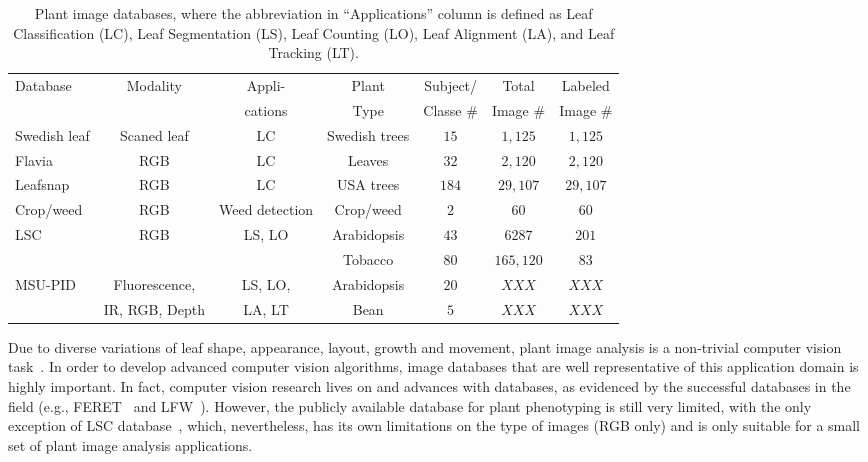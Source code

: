 \begin{table*}[t!]
	\centering
	\caption{Plant image databases, where the abbreviation in ``Applications'' column is defined as Leaf Classification (LC), Leaf Segmentation (LS), Leaf Counting (LO), Leaf Alignment (LA), and Leaf Tracking (LT).}
	\begin{tabular}{l|c|c|c|c|c|c}
		\hline
		\multirow{2}{*}{Database}&  \multirow{2}{*}{Modality}  & Appli-& Plant & Subject/ &Total  &  Labeled   \\ 						
			&         & cations &            Type         &       Classe \#         &  Image \#    & Image \# \\ \hline
		
Swedish leaf &  Scaned leaf & LC& Swedish trees & $15$ & $1,125$ & $1,125$ \\ \hline
Flavia& RGB  & LC& Leaves & $32$  & $2,120$ & $2,120$ \\ \hline
Leafsnap  & RGB & LC& USA trees & $184$ & $29,107$  &  $29,107$ \\ \hline
Crop/weed &  RGB &Weed detection & Crop/weed & $2$  & $60$ & $60$ \\ \hline
\multirow{2}{*}{LSC} & \multirow{2}{*}{RGB}  & \multirow{2}{*}{LS, LO} & Arabidopsis &  $43$ & $6287$ & $201$ \\ \cline{4-7}
							    &  & & Tobacco & $80$ & $165,120$ & $83$ \\ \hline
\multirow{2}{*}{MSU-PID}  & Fluorescence,  & LS, LO, & Arabidopsis &  $20$ & $XXX$ & $XXX$ \\ \cline{4-7}
							    & IR, RGB, Depth & LA, LT & Bean & $5$ & $XXX$ & $XXX$ \\ \hline
	       \hline
	\end{tabular}
	\label{tab:database}
\end{table*}

Due to diverse variations of leaf shape, appearance, layout, growth and movement, plant image analysis is a non-trivial computer vision task~\cite{Minervini2015}. 
In order to develop advanced computer vision algorithms, image databases that are well representative of this application domain is highly important. 
In fact, computer vision research lives on and advances with databases, as evidenced by the successful databases in the field (e.g., FERET~\cite{Phillips2000} and LFW~\cite{LFW}). 
However, the publicly available database for plant phenotyping is still very limited, with the only exception of LSC database~\cite{scharr2014annotated}, which, nevertheless, has its own limitations on the type of images (RGB only) and is only suitable for a small set of plant image analysis applications.



